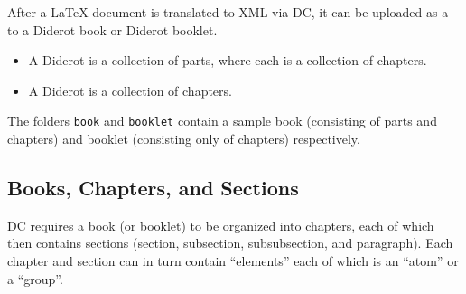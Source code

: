 \begin{definition}
After a LaTeX document is translated to XML via DC, it can be uploaded as a  to a Diderot book or Diderot booklet.  
%

\begin{itemize}
\item
A Diderot  is a collection of parts, where each  is a collection of chapters.

\item
A Diderot  is a collection of chapters. 
\end{itemize}
\end{definition}

\begin{example}
The folders \lstinline`book` and \lstinline`booklet` contain a sample book (consisting of parts and chapters) and booklet (consisting only of chapters) respectively.
\end{example}






\subsection{Books, Chapters, and Sections} 

DC requires a book (or booklet) to be organized into chapters, each of which then contains sections (section, subsection, subsubsection, and paragraph).  Each chapter and section can in turn contain ``elements'' each of which is an ``atom'' or a  ``group''.


